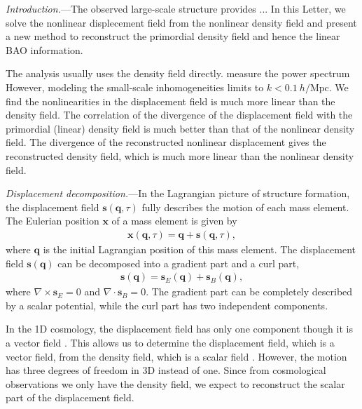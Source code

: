 \documentclass[aps,prd,twocolumn,showpacs,superscriptaddress,groupedaddress,nofootinbib]{revtex4}  %
\newcommand{\mr}{\mathrm}
\newcommand{\bea}{\begin{eqnarray}}
\newcommand{\eea}{\end{eqnarray}}
\begin{document}
\pacs{}
\maketitle


{\it Introduction.}---The observed large-scale structure provides ...
In this Letter, we solve the nonlinear displecement field from the nonlinear 
density field and present a new method to reconstruct the primordial density
field and hence the linear BAO information.

The analysis usually uses the density field directly. measure the power spectrum
However, modeling the small-scale inhomogeneities limits to $k<0.1\ h/\mr{Mpc}$.
We find the nonlinearities in the displacement field is much more linear than 
the density field. The correlation of the divergence of the displacement field
with the primordial (linear) density field is much better than that of the 
nonlinear density field. The divergence of the reconstructed nonlinear
displacement gives the reconstructed density field, which is much more linear
than the nonlinear density field.


{\it Displacement decomposition.}---In the Lagrangian picture of structure 
formation, 
the displacement field $\bm{s}(\bm{q},\tau)$ fully describes the motion of each mass element. The Eulerian position $\bm{x}$ of a mass element is given by
\bea
\bm{x}(\bm{q},\tau)=\bm{q}+\bm{s}(\bm{q},\tau),
\eea
where $\bm{q}$ is the initial Lagrangian position of this mass element.
The displacement field $\bm{s}(\bm{q})$ can be decomposed into a gradient part
and a curl part,
\bea
\bm{s}(\bm{q})=\bm{s}_E(\bm{q})+\bm{s}_B(\bm{q}),
\eea
where $\nabla\times\bm{s}_E=0$ and $\nabla\cdot\bm{s}_B=0$.
The gradient part can be completely described by a scalar potential,
while the curl part has two independent components.

In the 1D cosmology, the displacement field has only one component though 
it is a vector field \cite{2016matt}. 
This allows us to determine the displacement field, which is a vector field, 
from the density field, which is a scalar field \cite{2016arXiv160907041Z}.
However, the motion has three degrees of freedom in 3D instead of one.
Since from cosmological observations we only have the density field, we expect 
to reconstruct the scalar part of the displacement field.
\end{document}
